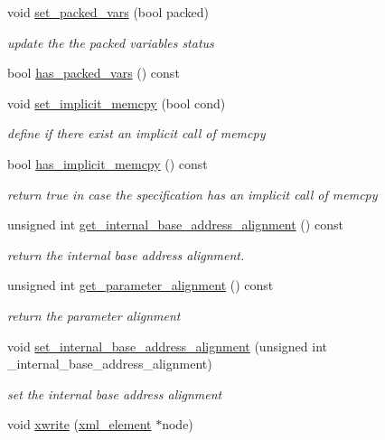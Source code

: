 \begin{DoxyCompactItemize}
void \hyperlink{classmemory_ad8729b135f5676bc9cb69047d4bf4120}{set\+\_\+packed\+\_\+vars} (bool packed)
\begin{DoxyCompactList}\small\item\em update the the packed variables status \end{DoxyCompactList}\item 
bool \hyperlink{classmemory_a454bcd8827a81dcc3ecc07cee955bdb6}{has\+\_\+packed\+\_\+vars} () const
\item 
void \hyperlink{classmemory_a685cd474a5a626474a519e9047866f78}{set\+\_\+implicit\+\_\+memcpy} (bool cond)
\begin{DoxyCompactList}\small\item\em define if there exist an implicit call of memcpy \end{DoxyCompactList}\item 
bool \hyperlink{classmemory_ac71f7ac117e1a1d85c9de59084a7cc41}{has\+\_\+implicit\+\_\+memcpy} () const
\begin{DoxyCompactList}\small\item\em return true in case the specification has an implicit call of memcpy \end{DoxyCompactList}\item 
unsigned int \hyperlink{classmemory_a0e9c0cfa49050ae635406d185b94809a}{get\+\_\+internal\+\_\+base\+\_\+address\+\_\+alignment} () const
\begin{DoxyCompactList}\small\item\em return the internal base address alignment. \end{DoxyCompactList}\item 
unsigned int \hyperlink{classmemory_a0b03a8a5198dc85c9c6b1f26bc5464ec}{get\+\_\+parameter\+\_\+alignment} () const
\begin{DoxyCompactList}\small\item\em return the parameter alignment \end{DoxyCompactList}\item 
void \hyperlink{classmemory_a104f9ba5a915851cfefe36fd606dc178}{set\+\_\+internal\+\_\+base\+\_\+address\+\_\+alignment} (unsigned int \+\_\+internal\+\_\+base\+\_\+address\+\_\+alignment)
\begin{DoxyCompactList}\small\item\em set the internal base address alignment \end{DoxyCompactList}\item 
void \hyperlink{classmemory_a078583e5743344036f0620cd532d5e89}{xwrite} (\hyperlink{classxml__element}{xml\+\_\+element} $\ast$node)

\end{DoxyCompactItemize}
